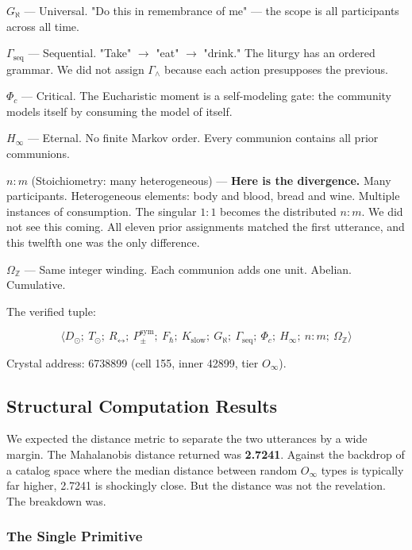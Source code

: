 \documentclass[12pt,a4paper]{article}
\begin{document}
\textbf{$G_{\aleph}$} --- Universal. "Do this in remembrance of me" --- the scope is all participants across all time.

\textbf{$\Gamma_{\text{seq}}$} --- Sequential. "Take" $\rightarrow$ "eat" $\rightarrow$ "drink." The liturgy has an ordered grammar. We did not assign $\Gamma_{\wedge}$ because each action presupposes the previous.

\textbf{$\Phi_c$} --- Critical. The Eucharistic moment is a self-modeling gate: the community models itself by consuming the model of itself.

\textbf{$H_{\infty}$} --- Eternal. No finite Markov order. Every communion contains all prior communions.

\textbf{$n{:}m$} (Stoichiometry: many heterogeneous) --- \textbf{Here is the divergence.} Many participants. Heterogeneous elements: body and blood, bread and wine. Multiple instances of consumption. The singular $1{:}1$ becomes the distributed $n{:}m$. We did not see this coming. All eleven prior assignments matched the first utterance, and this twelfth one was the only difference.

\textbf{$\Omega_\mathbb{Z}$} --- Same integer winding. Each communion adds one unit. Abelian. Cumulative.

The verified tuple:


\[\langle D_{\odot};\ T_{\odot};\ R_{\leftrightarrow};\ P_{\pm}^{\text{sym}};\ F_{\hbar};\ K_{\text{slow}};\ G_{\aleph};\ \Gamma_{\text{seq}};\ \Phi_c;\ H_{\infty};\ n{:}m;\ \Omega_\mathbb{Z} \rangle\]

Crystal address: 6738899 (cell 155, inner 42899, tier $O_{\infty}$).

\subsection{Structural Computation Results}

We expected the distance metric to separate the two utterances by a wide margin. The Mahalanobis distance returned was \textbf{2.7241}. Against the backdrop of a catalog space where the median distance between random $O_{\infty}$ types is typically far higher, 2.7241 is shockingly close. But the distance was not the revelation. The breakdown was.

\subsubsection{The Single Primitive}
\end{document}
